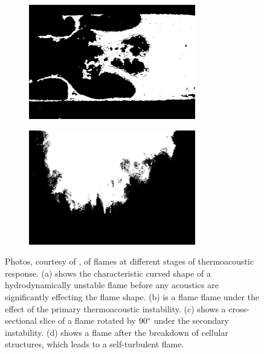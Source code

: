 \begin{figure}[t]
\begin{subfigure}{0.49\textwidth}
\centering
\includegraphics[height=5cm]{assets/imgs/Searby-92-flame_c.png}
\caption{}
\label{fig:Searby-92_flames_c}
\end{subfigure}
\hfill
\begin{subfigure}{0.49\textwidth}
\centering
\includegraphics[height=5cm]{assets/imgs/Searby-92-flame_d.png}
\caption{}
\label{fig:Searby-92_flames_d}
\end{subfigure}
\caption{Photos, courtesy of \cite{searby1992AcousticInstabilityPremixed}, of flames at different stages of thermoacoustic response. (a) shows the characteristic curved shape of a hydrodynamically unstable flame before any acoustics are significantly effecting the flame shape. (b) is a flame flame under the effect of the primary thermoacoustic instability. (c) shows a cross-sectional slice of a flame rotated by $90\degree$ under the secondary instability. (d) shows a flame after the breakdown of cellular structures, which leads to a self-turbulent flame.}
\label{fig:Searby-92_flames}
\end{figure}

